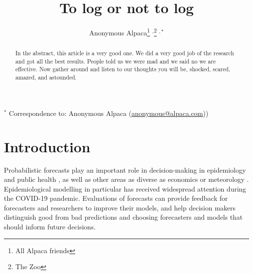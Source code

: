 \documentclass{article}
\begin{document}
\title{To log or not to log}
  \author{Anonymous Alpaca\thanks{All Alpaca friends} $^{,}$\thanks{The Zoo} $^{ , *}$}

\maketitle


\begin{abstract}
In the abstract, this article is a very good one. We did a very good job of the research and got all the best results. People told us we were mad and we said no we are effective. Now gather around and listen to our thoughts you will be, shocked, scared, amazed, and astounded.
\end{abstract}

\bigskip

{\footnotesize $^*$ Correspondence to: Anonymous Alpaca (\url{anonymous@alpaca.com}))}



\newpage


\section{Introduction}

Probabilistic forecasts play an important role in decision-making in epidemiology and public health \citep{reichCollaborativeMultiyearMultimodel2019, funkShorttermForecastsInform2020, cramerEvaluationIndividualEnsemble2021, bracherShorttermForecastingCOVID192021, europeancovid-19forecasthubEuropeanCovid19Forecast2021, sherrattPredictivePerformanceMultimodel2022}, as well as other areas as diverse as economics \citep{timmermannForecastingMethodsFinance2018, elliottForecastingEconomicsFinance2016} or meteorology \citep{gneitingWeatherForecastingEnsemble2005, kukkonenReviewOperationalRegionalscale2012}. Epidemiological modelling in particular has received widespread attention during the COVID-19 pandemic. Evaluations of forecasts can provide feedback for forecasters and researchers to improve their models, and help decision makers distinguish good from bad predictions and choosing forecasters and models that should inform future decisions.
\end{document}
